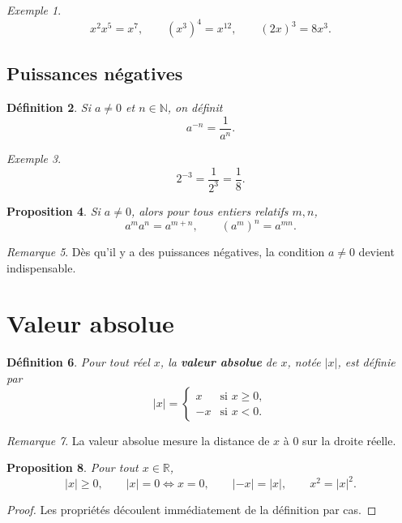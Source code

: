 \documentclass[11pt,a4paper]{article}
\newtheorem{definition}{Définition}[section]
\newtheorem{proposition}[definition]{Proposition}
\theoremstyle{remark}
\newtheorem{remarque}[definition]{Remarque}
\newtheorem{exemple}[definition]{Exemple}
\newcommand{\R}{\mathbb{R}}
\newcommand{\N}{\mathbb{N}}
\begin{document}
\begin{exemple}
\[
x^2x^5=x^7,
\qquad
(x^3)^4=x^{12},
\qquad
(2x)^3=8x^3.
\]
\end{exemple}

\subsection{Puissances négatives}

\begin{definition}
Si \(a\neq 0\) et \(n\in\N\), on définit
\[
a^{-n}=\frac{1}{a^n}.
\]
\end{definition}

\begin{exemple}
\[
2^{-3}=\frac{1}{2^3}=\frac{1}{8}.
\]
\end{exemple}

\begin{proposition}
Si \(a\neq 0\), alors pour tous entiers relatifs \(m,n\),
\[
a^m a^n=a^{m+n},
\qquad
(a^m)^n=a^{mn}.
\]
\end{proposition}

\begin{remarque}
Dès qu’il y a des puissances négatives, la condition \(a\neq 0\) devient indispensable.
\end{remarque}

\section{Valeur absolue}

\begin{definition}
Pour tout réel \(x\), la \textbf{valeur absolue} de \(x\), notée \(|x|\), est définie par
\[
|x|=
\begin{cases}
x & \text{si } x\geq 0,\\
-x & \text{si } x<0.
\end{cases}
\]
\end{definition}

\begin{remarque}
La valeur absolue mesure la distance de \(x\) à \(0\) sur la droite réelle.
\end{remarque}

\begin{proposition}
Pour tout \(x\in\R\),
\[
|x|\geq 0,
\qquad
|x|=0 \Longleftrightarrow x=0,
\qquad
|-x|=|x|,
\qquad
x^2=|x|^2.
\]
\end{proposition}

\begin{proof}
Les propriétés découlent immédiatement de la définition par cas.
\end{proof}
\end{document}
